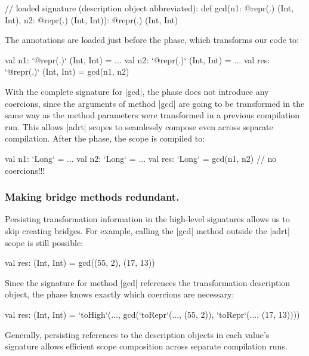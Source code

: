 \begin{lstlisting-nobreak}
// loaded signature (description object abbreviated):
def gcd(n1: @repr(.) (Int, Int), n2: @repr(.) (Int, Int)): @repr(.) (Int, Int)
\end{lstlisting-nobreak}

The annotations are loaded just before the \inject{} phase, which transforms our code to:

\begin{lstlisting-nobreak}
val n1: `@repr(.)` (Int, Int) = ...
val n2: `@repr(.)` (Int, Int) = ...
val res: `@repr(.)` (Int, Int) = gcd(n1, n2)
\end{lstlisting-nobreak}

With the complete signature for |gcd|, the \coerce{} phase does not introduce any coercions, since the arguments of method |gcd| are going to be transformed in the same way as the method parameters were transformed in a previous compilation run. This allows |adrt| scopes to seamlessly compose even across separate compilation. After the \commit{} phase, the scope is compiled to:

\begin{lstlisting-nobreak}
val n1: `Long` = ...
val n2: `Long` = ...
val res: `Long` = gcd(n1, n2) // no coercions!!!
\end{lstlisting-nobreak}

\subsubsection{Making bridge methods redundant.} Persisting transformation information in the high-level signatures allows us to skip creating bridges. For example, calling the |gcd| method outside the |adrt| scope is still possible:

\begin{lstlisting-nobreak}
val res: (Int, Int) = gcd((55, 2), (17, 13))
\end{lstlisting-nobreak}

Since the signature for method |gcd| references the transformation description object, the \coerce{} phase knows exactly which coercions are necessary:

\begin{lstlisting-nobreak}
val res: (Int, Int) = `toHigh`(...,
  gcd(`toRepr`(..., (55, 2)), `toRepr`(..., (17, 13))))
\end{lstlisting-nobreak}

Generally, persisting references to the description objects in each value's signature allows efficient scope composition across separate compilation runs.%

